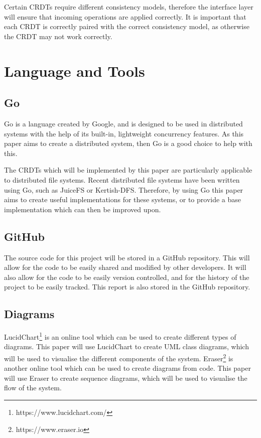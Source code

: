 \documentclass[12pt]{report}
\begin{document}
Certain CRDTs require different consistency models, therefore the interface layer will ensure that incoming operations are applied correctly. It is important that each CRDT is correctly paired with the correct consistency model, as otherwise the CRDT may not work correctly. \par

\section{Language and Tools}
\subsection{Go}
Go is a language created by Google, and is designed to be used in distributed systems with the help of its built-in, lightweight concurrency features. As this paper aims to create a distributed system, then Go is a good choice to help with this. \par

The CRDTs which will be implemented by this paper are particularly applicable to distributed file systems. Recent distributed file systems have been written using Go, such as JuiceFS or Kertish-DFS. Therefore, by using Go this paper aims to create useful implementations for these systems, or to provide a base implementation which can then be improved upon. \par


\subsection{GitHub}
The source code for this project will be stored in a GitHub repository. This will allow for the code to be easily shared and modified by other developers. It will also allow for the code to be easily version controlled, and for the history of the project to be easily tracked. This report is also stored in the GitHub repository. \par

\subsection{Diagrams}
LucidChart\footnote{https://www.lucidchart.com/} is an online tool which can be used to create different types of diagrams. This paper will use LucidChart to create UML class diagrams, which will be used to visualise the different components of the system. Eraser\footnote{https://www.eraser.io} is another online tool which can be used to create diagrams from code. This paper will use Eraser to create sequence diagrams, which will be used to visualise the flow of the system. \par
\end{document}
